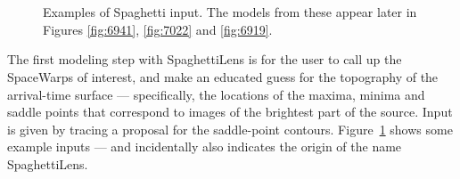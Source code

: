 \documentclass[12pt,preprint]{aastex}
\newcommand{\spl}{SpaghettiLens\xspace}
\newcommand{\sw}{SpaceWarps\xspace}
\newcommand{\Figref}[1]{Figure~\ref{fig:#1}}
\begin{document}
\begin{figure}
  \centering
   \\
   \\
  \caption{Examples of Spaghetti input.  The models from these appear
    later in Figures \ref{fig:6941}, \ref{fig:7022} and \ref{fig:6919}.
  }
  \label{fig:input-spag}
\end{figure}

The first modeling step with \spl is for the user to call up the \sw
of interest, and make an educated guess for the topography of the
arrival-time surface --- specifically, the locations of the maxima,
minima and saddle points that correspond to images of the brightest
part of the source.  Input is given by tracing a proposal for the
saddle-point contours.  \Figref{input-spag} shows some example
inputs --- and incidentally also indicates the origin of the name
\spl.
\end{document}
